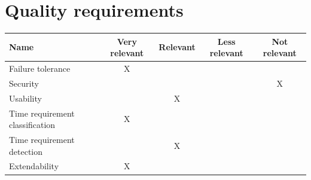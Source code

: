 \documentclass[parskip=full]{scrartcl}
\begin{document}
\section{Quality requirements}
\begin{tabular}{|p{3cm}|c|c|c|c|}
\hline
\textbf{Name} & \textbf{Very relevant} & \textbf{Relevant} & \textbf{Less relevant} & \textbf{Not relevant}\\
\hline
Failure tolerance & X & & & \\
\hline
Security & & & & X \\
\hline
Usability & & X & & \\
\hline
Time requirement classification& X & & &\\
\hline
Time requirement detection& & X & &\\
\hline
Extendability & X & & &\\
\hline
\end{tabular}
\clearpage

\printnoidxglossaries
\end{document}
